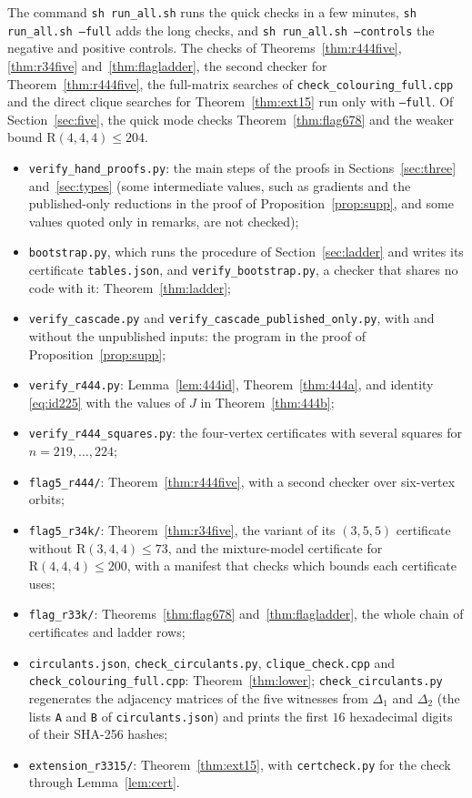 \documentclass[11pt]{article}
\theoremstyle{spacedplain}
\theoremstyle{spaceddef}
\theoremstyle{spacedremark}
\newcommand{\R}{\mathrm{R}}
\begin{document}
The command \texttt{sh run\_all.sh} runs the quick checks in a few minutes, \texttt{sh run\_all.sh --full} adds the long checks, and \texttt{sh run\_all.sh --controls} the negative and positive controls.
The checks of Theorems~\ref{thm:r444five}, \ref{thm:r34five} and~\ref{thm:flagladder}, the second checker for Theorem~\ref{thm:r444five}, the full-matrix searches of \texttt{check\_colouring\_full.cpp} and the direct clique searches for Theorem~\ref{thm:ext15} run only with \texttt{--full}.
Of Section~\ref{sec:five}, the quick mode checks Theorem~\ref{thm:flag678} and the weaker bound $\R(4,4,4)\le 204$.
\begin{itemize}[leftmargin=1.2em]\raggedright
\item \texttt{verify\_hand\_proofs.py}: the main steps of the proofs in Sections~\ref{sec:three} and~\ref{sec:types} (some intermediate values, such as gradients and the published-only reductions in the proof of Proposition~\ref{prop:supp}, and some values quoted only in remarks, are not checked);
\item \texttt{bootstrap.py}, which runs the procedure of Section~\ref{sec:ladder} and writes its certificate \texttt{tables.json}, and \texttt{verify\_bootstrap.py}, a checker that shares no code with it: Theorem~\ref{thm:ladder};
\item \texttt{verify\_cascade.py} and \texttt{verify\_cascade\_published\_only.py}, with and without the unpublished inputs: the program in the proof of Proposition~\ref{prop:supp};
\item \texttt{verify\_r444.py}: Lemma~\ref{lem:444id}, Theorem~\ref{thm:444a}, and identity \eqref{eq:id225} with the values of $J$ in Theorem~\ref{thm:444b};
\item \texttt{verify\_r444\_squares.py}: the four-vertex certificates with several squares for $n=219,\dots,224$;
\item \texttt{flag5\_r444/}: Theorem~\ref{thm:r444five}, with a second checker over six-vertex orbits;
\item \texttt{flag5\_r34k/}: Theorem~\ref{thm:r34five}, the variant of its $(3,5,5)$ certificate without $\R(3,4,4)\le 73$, and the mixture-model certificate for $\R(4,4,4)\le 200$, with a manifest that checks which bounds each certificate uses;
\item \texttt{flag\_r33k/}: Theorems~\ref{thm:flag678} and~\ref{thm:flagladder}, the whole chain of certificates and ladder rows;
\item \texttt{circulants.json}, \texttt{check\_circulants.py}, \texttt{clique\_check.cpp} and \texttt{check\_colouring\_full.cpp}: Theorem~\ref{thm:lower}; \texttt{check\_circulants.py} regenerates the adjacency matrices of the five witnesses from $\Delta_1$ and $\Delta_2$ (the lists \texttt{A} and \texttt{B} of \texttt{circulants.json}) and prints the first $16$ hexadecimal digits of their SHA-256 hashes;
\item \texttt{extension\_r3315/}: Theorem~\ref{thm:ext15}, with \texttt{certcheck.py} for the check through Lemma~\ref{lem:cert}.
\end{itemize}
\end{document}
